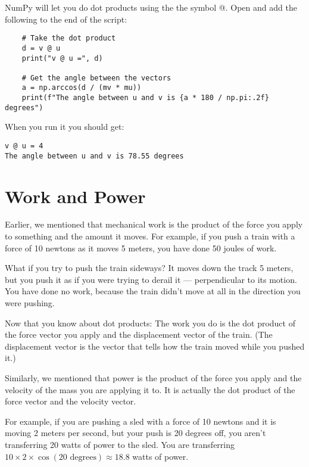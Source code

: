 NumPy will let you do dot products using the the symbol @.  Open  
and add the following to the end of the script:

\begin{Verbatim}
    # Take the dot product
    d = v @ u
    print("v @ u =", d)
    
    # Get the angle between the vectors
    a = np.arccos(d / (mv * mu))
    print(f"The angle between u and v is {a * 180 / np.pi:.2f} degrees")    
\end{Verbatim}

When you run it you should get:
\begin{Verbatim}
v @ u = 4
The angle between u and v is 78.55 degrees
\end{Verbatim}

\section{Work and Power}
Earlier, we mentioned that mechanical work is the product of the 
force you apply to something and the amount it moves. For example, if you 
push a train with a force of 10 newtons as it moves 5 meters, you have done 50 joules of work.

What if you try to push the train sideways? It moves down the track 5 meters, 
but you push it as if you were trying to derail it --- perpendicular to its motion.  
You have done no work, because the train didn't move at all in the direction you were pushing.



Now that you know about dot products: The work you do is the dot
product of the force vector you apply and the displacement vector of the train. (The displacement
vector is the vector that tells how the train moved while you pushed it.) 

Similarly, we mentioned that power is the product of the force you apply and the velocity of the
mass you are applying it to. It is actually the dot product of the force vector and the velocity vector.

For example, if you are pushing a sled with a force of 10 newtons and it is moving 2 meters per second, 
but your push is 20 degrees off, you aren't transferring 20 watts of power to the sled.  
You are transferring $10 \times 2 \times \cos(20 \text{ degrees}) \approx 18.8$ watts of power.
